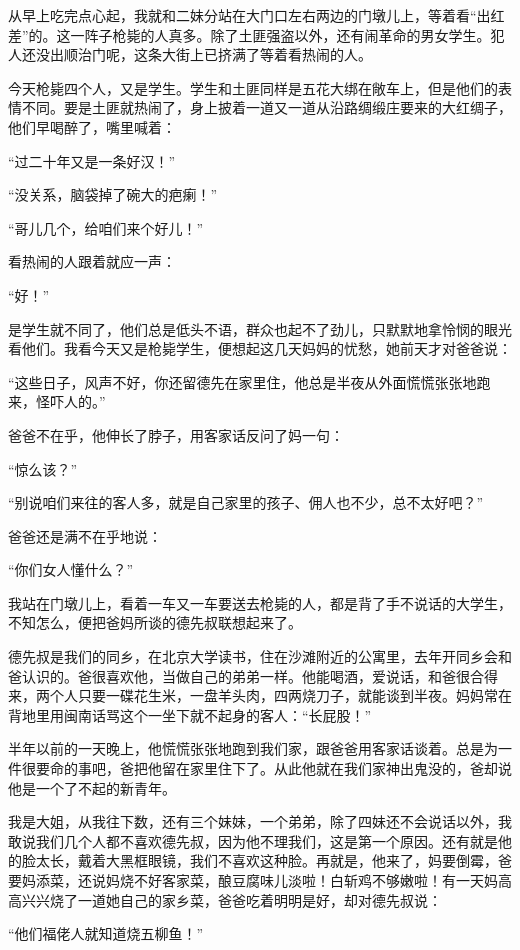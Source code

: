 \par 从早上吃完点心起，我就和二妹分站在大门口左右两边的门墩儿上，等着看“出红差”的。这一阵子枪毙的人真多。除了土匪强盗以外，还有闹革命的男女学生。犯人还没出顺治门呢，这条大街上已挤满了等着看热闹的人。
\par 今天枪毙四个人，又是学生。学生和土匪同样是五花大绑在敞车上，但是他们的表情不同。要是土匪就热闹了，身上披着一道又一道从沿路绸缎庄要来的大红绸子，他们早喝醉了，嘴里喊着：
\par “过二十年又是一条好汉！”
\par “没关系，脑袋掉了碗大的疤瘌！”
\par “哥儿几个，给咱们来个好儿！”
\par 看热闹的人跟着就应一声：
\par “好！”
\par 是学生就不同了，他们总是低头不语，群众也起不了劲儿，只默默地拿怜悯的眼光看他们。我看今天又是枪毙学生，便想起这几天妈妈的忧愁，她前天才对爸爸说：
\par “这些日子，风声不好，你还留德先在家里住，他总是半夜从外面慌慌张张地跑来，怪吓人的。”
\par 爸爸不在乎，他伸长了脖子，用客家话反问了妈一句：
\par “惊么该？”
\par “别说咱们来往的客人多，就是自己家里的孩子、佣人也不少，总不太好吧？”
\par 爸爸还是满不在乎地说：
\par “你们女人懂什么？”
\par 我站在门墩儿上，看着一车又一车要送去枪毙的人，都是背了手不说话的大学生，不知怎么，便把爸妈所谈的德先叔联想起来了。
\par 德先叔是我们的同乡，在北京大学读书，住在沙滩附近的公寓里，去年开同乡会和爸认识的。爸很喜欢他，当做自己的弟弟一样。他能喝酒，爱说话，和爸很合得来，两个人只要一碟花生米，一盘羊头肉，四两烧刀子，就能谈到半夜。妈妈常在背地里用闽南话骂这个一坐下就不起身的客人：“长屁股！”
\par 半年以前的一天晚上，他慌慌张张地跑到我们家，跟爸爸用客家话谈着。总是为一件很要命的事吧，爸把他留在家里住下了。从此他就在我们家神出鬼没的，爸却说他是一个了不起的新青年。
\par 我是大姐，从我往下数，还有三个妹妹，一个弟弟，除了四妹还不会说话以外，我敢说我们几个人都不喜欢德先叔，因为他不理我们，这是第一个原因。还有就是他的脸太长，戴着大黑框眼镜，我们不喜欢这种脸。再就是，他来了，妈要倒霉，爸要妈添菜，还说妈烧不好客家菜，酿豆腐味儿淡啦！白斩鸡不够嫩啦！有一天妈高高兴兴烧了一道她自己的家乡菜，爸爸吃着明明是好，却对德先叔说：
\par “他们福佬人就知道烧五柳鱼！”
